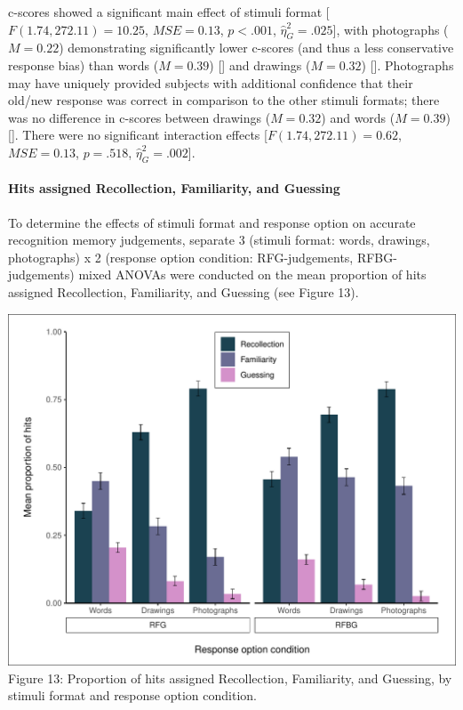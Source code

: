 \documentclass[
  11pt,
]{article}
\begin{document}
c-scores showed a significant main effect of stimuli format
{[}\(F(1.74, 272.11) = 10.25\), \(\mathit{MSE} = 0.13\), \(p < .001\),
\(\hat{\eta}^2_G = .025\){]}, with photographs (\(M = 0.22\))
demonstrating significantly lower c-scores (and thus a less conservative
response bias) than words (\(M = 0.39\)) {[}{]} and drawings
(\(M = 0.32\)) {[}{]}. Photographs may have uniquely provided subjects
with additional confidence that their old/new response was correct in
comparison to the other stimuli formats; there was no difference in
c-scores between drawings (\(M = 0.32\)) and words (\(M = 0.39\))
{[}{]}. There were no significant interaction effects
{[}\(F(1.74, 272.11) = 0.62\), \(\mathit{MSE} = 0.13\), \(p = .518\),
\(\hat{\eta}^2_G = .002\){]}.

\hypertarget{hits-assigned-recollection-familiarity-and-guessing}{%
\paragraph{Hits assigned Recollection, Familiarity, and
Guessing}\label{hits-assigned-recollection-familiarity-and-guessing}}

To determine the effects of stimuli format and response option on
accurate recognition memory judgements, separate 3 (stimuli format:
words, drawings, photographs) x 2 (response option condition:
RFG-judgements, RFBG-judgements) mixed ANOVAs were conducted on the mean
proportion of hits assigned Recollection, Familiarity, and Guessing (see
Figure 13).

\includegraphics{R--Thesis_files/figure-latex/unnamed-chunk-38-1.pdf}
Figure 13: Proportion of hits assigned Recollection, Familiarity, and
Guessing, by stimuli format and response option condition.
\end{document}
